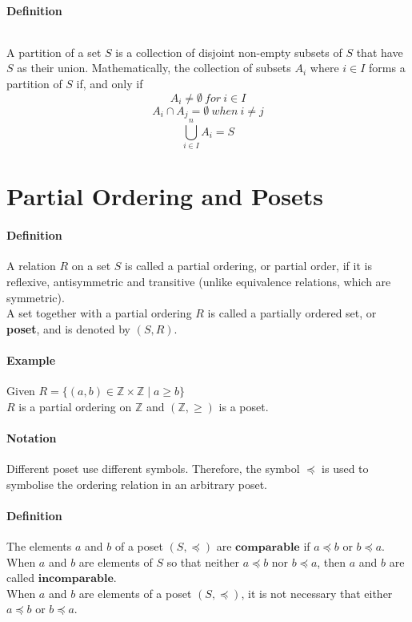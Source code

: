 \documentclass[10pt,a4paper]{book}
\begin{document}
\paragraph*{Definition}
$\ $\par
A partition of a set $S$ is a collection of disjoint non-empty subsets of $S$ that have $S$ as their union. Mathematically, the collection of subsets $A_i$ where $i \in I$ forms a partition of $S$ if, and only if 
\[A_{i} \neq \emptyset \ for \  i \in I\]
\[A_{i} \cap A_j = \emptyset \  when \ i \neq j\]
\[\bigcup_{i \in I}^{n} A_{i} = S\]

\section{Partial Ordering and Posets}
\paragraph*{Definition}
A relation $R$ on a set $S$ is called a partial ordering, or partial order, if it is reflexive, antisymmetric and transitive (unlike equivalence relations, which are symmetric).\\
A set together with a partial ordering $R$ is called a partially ordered set, or \textbf{poset}, and is denoted by $(S,R)$.
\paragraph*{Example}
Given $R = \{(a,b) \in \mathbb{Z} \times \mathbb{Z} \mid a \geqslant b \}$\\
$R$ is a partial ordering on $\mathbb{Z}$ and $(\mathbb{Z}, \geqslant)$ is a poset.
\paragraph*{Notation}
Different poset use different symbols. Therefore, the symbol $\preceq$ is used to symbolise the ordering relation in an arbitrary poset.
\paragraph*{Definition}
The elements $a$ and $b$ of a poset $(S,\preceq)$ are $\mathbf{comparable}$ if $a \preceq b$ or $b \preceq a$.\\
When $a$ and $b$ are elements of $S$ so that neither $a \preceq b$ nor $b \preceq a$, then $a$ and $b$ are called $\mathbf{incomparable}$.\\
When $a$ and $b$ are elements of a poset $(S,\preceq)$, it is not necessary that either $a \preceq b$ or $b \preceq a$.
\end{document}
